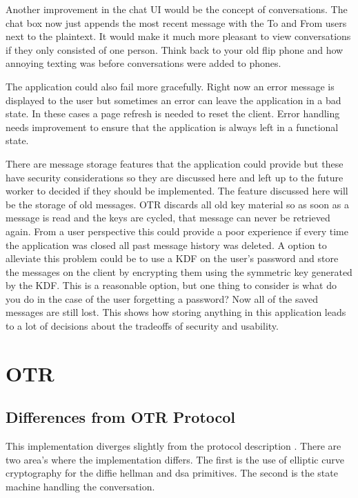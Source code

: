 Another improvement in the chat UI would be the concept of conversations. The chat box now just appends the most recent message with the To and From users next to the plaintext. It would make it much more pleasant to view conversations if they only consisted of one person. Think back to your old flip phone and how annoying texting was before conversations were added to phones.


The application could also fail more gracefully. Right now an error message is displayed to the user but sometimes an error can leave the application in a bad state. In these cases a page refresh is needed to reset the client. Error handling needs improvement to ensure that the application is always left in a functional state.


There are message storage features that the application could provide but these have security considerations so they are discussed here and left up to the future worker to decided if they should be implemented. The feature discussed here will be the storage of old messages. OTR discards all old key material so as soon as a message is read and the keys are cycled, that message can never be retrieved again. From a user perspective this could provide a poor experience if every time the application was closed all past message history was deleted. A option to alleviate this problem could be to use a KDF on the user's password and store the messages on the client by encrypting them using the symmetric key generated by the KDF. This is a reasonable option, but one thing to consider is what do you do in the case of the user forgetting a password? Now all of the saved messages are still lost. This shows how storing anything in this application leads to a lot of decisions about the tradeoffs of security and usability.


\section{OTR}


\subsection{Differences from OTR Protocol}


This implementation diverges slightly from the protocol description \cite{otr-protocol}. There are two area's where the implementation differs. The first is the use of elliptic curve cryptography for the diffie hellman and dsa primitives. The second is the state machine handling the conversation.


